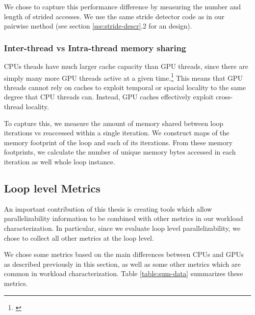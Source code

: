 \documentclass[12pt,twoside]{reedthesis}
\begin{document}
		We chose to capture this performance difference by measuring the number and length of strided accesses. 
		We use the same stride detector code as in our pairwise method (see section \ref{sse:stride-descr}.2 for an design). 
		
		
		\subsubsection{Inter-thread vs Intra-thread memory sharing}
		
		CPUs theads have much larger cache capacity than GPU threads, since there are simply many more GPU threads active at a given time.\footnote{\cite{Jia:6835938}} This means that GPU threads cannot rely on caches to exploit temporal or spacial locality to the same degree that CPU threads can. Instead, GPU caches effectively exploit cross-thread locality. 
		
		To capture this, we measure the amount of memory shared between loop iterations vs reaccessed within a single iteration.
		We construct maps of the memory footprint of the loop and each of its iterations. From these memory footprints, we calculate the number of unique memory bytes accessed in each iteration as well whole loop instance. %
		
	\subsection{Loop level Metrics}
		
		An important contribution of this thesis is creating tools which allow parallelizability information to be combined with other metrics in our workload characterization. 
		In particular, since we evaluate loop level parallelizability, we chose to collect all other metrics at the loop level. 
		
		We chose some metrics based on the main differences between CPUs and GPUs as described previously in this section, as well as some other metrics which are common in workload characterization. Table \ref{table:sum-data} summarizes these metrics. 
		
\end{document}

